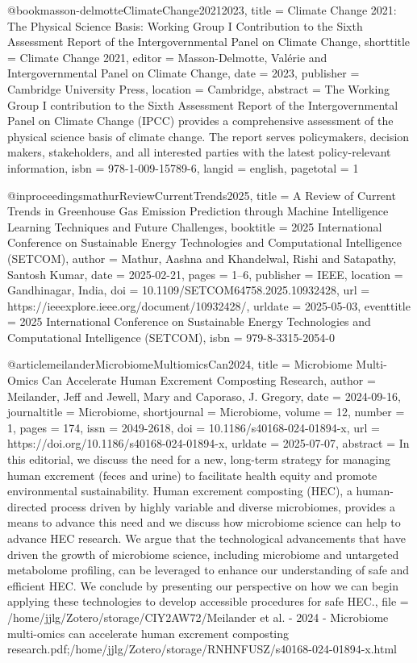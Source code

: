 {{{{@book{masson-delmotteClimateChange20212023,
  title = {Climate Change 2021: The Physical Science Basis: {{Working Group I}} Contribution to the {{Sixth Assessment Report}} of the {{Intergovernmental Panel}} on {{Climate Change}}},
  shorttitle = {Climate Change 2021},
  editor = {Masson-Delmotte, Valérie and {Intergovernmental Panel on Climate Change}},
  date = {2023},
  publisher = {Cambridge University Press},
  location = {Cambridge},
  abstract = {The Working Group I contribution to the Sixth Assessment Report of the Intergovernmental Panel on Climate Change (IPCC) provides a comprehensive assessment of the physical science basis of climate change. The report serves policymakers, decision makers, stakeholders, and all interested parties with the latest policy-relevant information},
  isbn = {978-1-009-15789-6},
  langid = {english},
  pagetotal = {1}
}

@inproceedings{mathurReviewCurrentTrends2025,
  title = {A {{Review}} of {{Current Trends}} in {{Greenhouse Gas Emission Prediction}} through {{Machine Intelligence Learning Techniques}} and {{Future Challenges}}},
  booktitle = {2025 {{International Conference}} on {{Sustainable Energy Technologies}} and {{Computational Intelligence}} ({{SETCOM}})},
  author = {Mathur, Aashna and Khandelwal, Rishi and Satapathy, Santosh Kumar},
  date = {2025-02-21},
  pages = {1--6},
  publisher = {IEEE},
  location = {Gandhinagar, India},
  doi = {10.1109/SETCOM64758.2025.10932428},
  url = {https://ieeexplore.ieee.org/document/10932428/},
  urldate = {2025-05-03},
  eventtitle = {2025 {{International Conference}} on {{Sustainable Energy Technologies}} and {{Computational Intelligence}} ({{SETCOM}})},
  isbn = {979-8-3315-2054-0}
}

@article{meilanderMicrobiomeMultiomicsCan2024,
  title = {Microbiome Multi-Omics Can Accelerate Human Excrement Composting Research},
  author = {Meilander, Jeff and Jewell, Mary and Caporaso, J. Gregory},
  date = {2024-09-16},
  journaltitle = {Microbiome},
  shortjournal = {Microbiome},
  volume = {12},
  number = {1},
  pages = {174},
  issn = {2049-2618},
  doi = {10.1186/s40168-024-01894-x},
  url = {https://doi.org/10.1186/s40168-024-01894-x},
  urldate = {2025-07-07},
  abstract = {In this editorial, we discuss the need for a new, long-term strategy for managing human excrement (feces and urine) to facilitate health equity and promote environmental sustainability. Human excrement composting (HEC), a human-directed process driven by highly variable and diverse microbiomes, provides a means to advance this need and we discuss how microbiome science can help to advance HEC research. We argue that the technological advancements that have driven the growth of microbiome science, including microbiome and untargeted metabolome profiling, can be leveraged to enhance our understanding of safe and efficient HEC. We conclude by presenting our perspective on how we can begin applying these technologies to develop accessible procedures for safe HEC.},
  file = {/home/jjlg/Zotero/storage/CIY2AW72/Meilander et al. - 2024 - Microbiome multi-omics can accelerate human excrement composting research.pdf;/home/jjlg/Zotero/storage/RNHNFUSZ/s40168-024-01894-x.html}
}

}}}}

